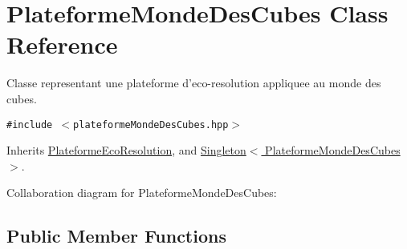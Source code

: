 \hypertarget{classPlateformeMondeDesCubes}{
\section{PlateformeMondeDesCubes Class Reference}
\label{classPlateformeMondeDesCubes}
}
Classe representant une plateforme d'eco-resolution appliquee au monde des cubes.  


{\tt \#include $<$plateformeMondeDesCubes.hpp$>$}

Inherits \hyperlink{classPlateformeEcoResolution}{PlateformeEcoResolution}, and \hyperlink{classSingleton}{Singleton$<$ PlateformeMondeDesCubes $>$}.

Collaboration diagram for PlateformeMondeDesCubes:\subsection*{Public Member Functions}
